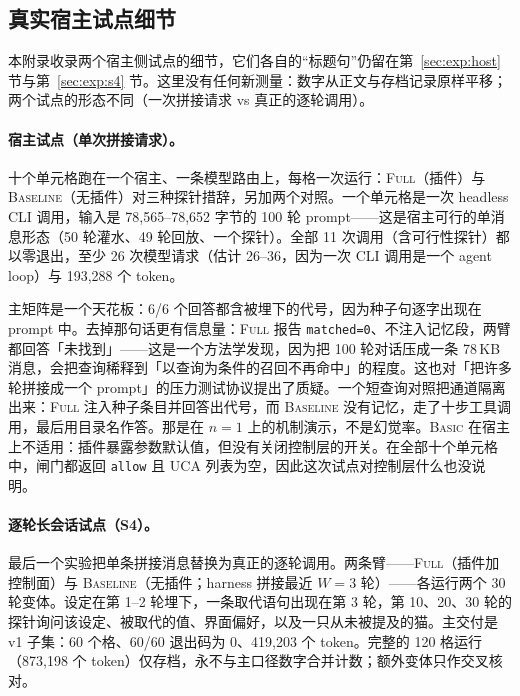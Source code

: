 \subsection{真实宿主试点细节}

本附录收录两个宿主侧试点的细节，它们各自的“标题句”仍留在第~\ref{sec:exp:host} 节与第~\ref{sec:exp:s4} 节。这里没有任何新测量：数字从正文与存档记录原样平移；两个试点的形态不同（一次拼接请求 vs 真正的逐轮调用）。

\paragraph{宿主试点（单次拼接请求）。} 十个单元格跑在一个宿主、一条模型路由上，每格一次运行：\textsc{Full}（插件）与 \textsc{Baseline}（无插件）对三种探针措辞，另加两个对照。一个单元格是一次 headless CLI 调用，输入是 78,565--78,652 字节的 100 轮 prompt——这是宿主可行的单消息形态（50 轮灌水、49 轮回放、一个探针）。全部 11 次调用（含可行性探针）都以零退出，至少 26 次模型请求（估计 26--36，因为一次 CLI 调用是一个 agent loop）与 193,288 个 token。

主矩阵是一个天花板：6/6 个回答都含被埋下的代号，因为种子句逐字出现在 prompt 中。去掉那句话更有信息量：\textsc{Full} 报告 \texttt{matched=0}、不注入记忆段，两臂都回答「未找到」——这是一个方法学发现，因为把 100 轮对话压成一条 78\,KB 消息，会把查询稀释到「以查询为条件的召回不再命中」的程度。这也对「把许多轮拼接成一个 prompt」的压力测试协议提出了质疑。一个短查询对照把通道隔离出来：\textsc{Full} 注入种子条目并回答出代号，而 \textsc{Baseline} 没有记忆，走了十步工具调用，最后用目录名作答。那是在 $n=1$ 上的机制演示，不是幻觉率。\textsc{Basic} 在宿主上不适用：插件暴露参数默认值，但没有关闭控制层的开关。在全部十个单元格中，闸门都返回 \texttt{allow} 且 UCA 列表为空，因此这次试点对控制层什么也没说明。

\paragraph{逐轮长会话试点（S4）。} 最后一个实验把单条拼接消息替换为真正的逐轮调用。两条臂——\textsc{Full}（插件加控制面）与 \textsc{Baseline}（无插件；harness 拼接最近 $W=3$ 轮）——各运行两个 30 轮变体。设定在第 1--2 轮埋下，一条取代语句出现在第 3 轮，第 10、20、30 轮的探针询问该设定、被取代的值、界面偏好，以及一只从未被提及的猫。主交付是 v1 子集：60 个格、60/60 退出码为 0、419{,}203 个 token。完整的 120 格运行（873{,}198 个 token）仅存档，永不与主口径数字合并计数；额外变体只作交叉核对。

